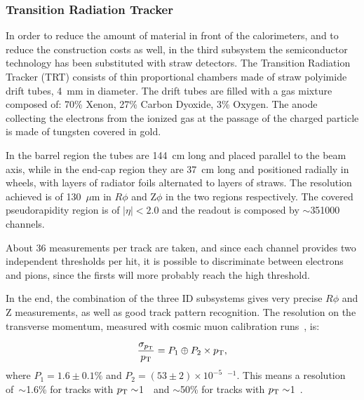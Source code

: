 
\subsubsection{Transition Radiation Tracker}

In order to reduce the amount of material in front of the calorimeters, and to reduce the construction costs as well,
in the third subsystem the semiconductor technology has been substituted with straw detectors.
The Transition Radiation Tracker (TRT) consists of thin proportional chambers made of straw polyimide drift tubes, 4~mm in diameter.
The drift tubes are filled with a gas mixture composed of: 70\% Xenon, 27\% Carbon Dyoxide, 3\% Oxygen. The anode 
collecting the electrons from the ionized gas at the passage of the charged particle is made of
tungsten covered in gold.

In the barrel region the tubes are 144~cm long and placed parallel to the beam axis, while in the 
end-cap region they are 37~cm long and positioned radially in wheels, with layers of radiator foils alternated 
to layers of straws. The resolution achieved is of 130~$\mu$m in $R\phi$ and Z$\phi$  in the two regions respectively.
The covered pseudorapidity region is of $|\eta|<2.0$ and the readout is composed by $\sim$351000 channels.

About 36 measurements per track are taken, and since each channel provides two independent thresholds per hit,
it is possible to discriminate between electrons and pions, since the firsts will more probably reach the
high threshold.

In the end, the combination of the three ID subsystems gives very precise $R\phi$ and Z measurements, as well as good track pattern recognition.
The resolution on the transverse momentum, measured with cosmic muon calibration runs~\cite{id_cosmic}, is:

\begin{equation}\label{eq:momentumres}
\frac{\sigma_{\pt}}{\pt}=P_1 \oplus P_2 \times \pt,
	\end{equation}
where $P_1=1.6\pm0.1\%$ and $P_2=(53\pm2)\times10^{-5}$~\GeV$^{-1}$. This means a 
resolution of~$\sim$1.6\% for tracks with $\pt\sim$1~\GeV\ and 
$\sim$50\% for tracks with $\pt\sim$1~\tev.


